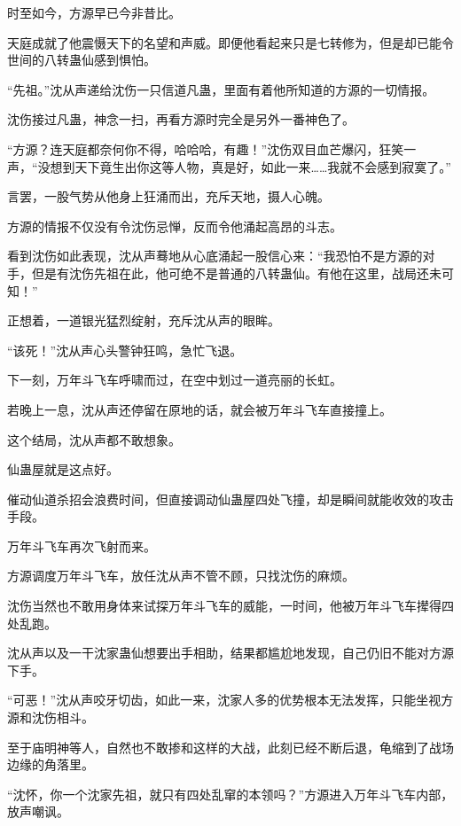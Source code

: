 
\begin{this_body}

时至如今，方源早已今非昔比。

天庭成就了他震慑天下的名望和声威。即便他看起来只是七转修为，但是却已能令世间的八转蛊仙感到惧怕。

“先祖。”沈从声递给沈伤一只信道凡蛊，里面有着他所知道的方源的一切情报。

沈伤接过凡蛊，神念一扫，再看方源时完全是另外一番神色了。

“方源？连天庭都奈何你不得，哈哈哈，有趣！”沈伤双目血芒爆闪，狂笑一声，“没想到天下竟生出你这等人物，真是好，如此一来……我就不会感到寂寞了。”

言罢，一股气势从他身上狂涌而出，充斥天地，摄人心魄。

方源的情报不仅没有令沈伤忌惮，反而令他涌起高昂的斗志。

看到沈伤如此表现，沈从声蓦地从心底涌起一股信心来：“我恐怕不是方源的对手，但是有沈伤先祖在此，他可绝不是普通的八转蛊仙。有他在这里，战局还未可知！”

正想着，一道银光猛烈绽射，充斥沈从声的眼眸。

“该死！”沈从声心头警钟狂鸣，急忙飞退。

下一刻，万年斗飞车呼啸而过，在空中划过一道亮丽的长虹。

若晚上一息，沈从声还停留在原地的话，就会被万年斗飞车直接撞上。

这个结局，沈从声都不敢想象。

仙蛊屋就是这点好。

催动仙道杀招会浪费时间，但直接调动仙蛊屋四处飞撞，却是瞬间就能收效的攻击手段。

万年斗飞车再次飞射而来。

方源调度万年斗飞车，放任沈从声不管不顾，只找沈伤的麻烦。

沈伤当然也不敢用身体来试探万年斗飞车的威能，一时间，他被万年斗飞车撵得四处乱跑。

沈从声以及一干沈家蛊仙想要出手相助，结果都尴尬地发现，自己仍旧不能对方源下手。

“可恶！”沈从声咬牙切齿，如此一来，沈家人多的优势根本无法发挥，只能坐视方源和沈伤相斗。

至于庙明神等人，自然也不敢掺和这样的大战，此刻已经不断后退，龟缩到了战场边缘的角落里。

“沈怀，你一个沈家先祖，就只有四处乱窜的本领吗？”方源进入万年斗飞车内部，放声嘲讽。


\end{this_body}
